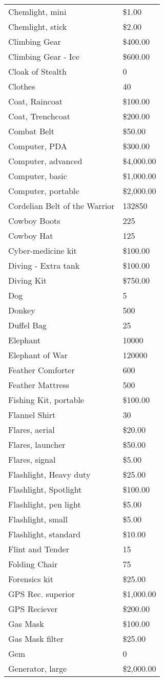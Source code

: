 \documentclass[twoside]{book}
\begin{document}
\begin{longtable}{p{1.25in}l}
      \raggedright  Chemlight, mini& \$1.00\tabularnewline
      \raggedright  Chemlight, stick& \$2.00\tabularnewline
      \raggedright  Climbing Gear& \$400.00\tabularnewline
      \raggedright  Climbing Gear - Ice& \$600.00\tabularnewline
      \raggedright  Cloak of Stealth& 0\tabularnewline
      \raggedright  Clothes& 40\tabularnewline
      \raggedright  Coat, Raincoat& \$100.00\tabularnewline
      \raggedright  Coat, Trenchcoat& \$200.00\tabularnewline
      \raggedright  Combat Belt& \$50.00\tabularnewline
      \raggedright  Computer, PDA& \$300.00\tabularnewline
      \raggedright  Computer, advanced& \$4,000.00\tabularnewline
      \raggedright  Computer, basic& \$1,000.00\tabularnewline
      \raggedright  Computer, portable& \$2,000.00\tabularnewline
      \raggedright  Cordelian Belt of the Warrior& 132850\tabularnewline
      \raggedright  Cowboy Boots& 225\tabularnewline
      \raggedright  Cowboy Hat& 125\tabularnewline
      \raggedright  Cyber-medicine kit& \$100.00\tabularnewline
      \raggedright  Diving - Extra tank& \$100.00\tabularnewline
      \raggedright  Diving Kit& \$750.00\tabularnewline
      \raggedright  Dog& 5\tabularnewline
      \raggedright  Donkey& 500\tabularnewline
      \raggedright  Duffel Bag& 25\tabularnewline
      \raggedright  Elephant& 10000\tabularnewline
      \raggedright  Elephant of War& 120000\tabularnewline
      \raggedright  Feather Comforter& 600\tabularnewline
      \raggedright  Feather Mattress& 500\tabularnewline
      \raggedright  Fishing Kit, portable& \$100.00\tabularnewline
      \raggedright  Flannel Shirt& 30\tabularnewline
      \raggedright  Flares, aerial& \$20.00\tabularnewline
      \raggedright  Flares, launcher& \$50.00\tabularnewline
      \raggedright  Flares, signal& \$5.00\tabularnewline
      \raggedright  Flashlight, Heavy duty& \$25.00\tabularnewline
      \raggedright  Flashlight, Spotlight& \$100.00\tabularnewline
      \raggedright  Flashlight, pen light& \$5.00\tabularnewline
      \raggedright  Flashlight, small& \$5.00\tabularnewline
      \raggedright  Flashlight, standard& \$10.00\tabularnewline
      \raggedright  Flint and Tender& 15\tabularnewline
      \raggedright  Folding Chair& 75\tabularnewline
      \raggedright  Forensics kit& \$25.00\tabularnewline
      \raggedright  GPS Rec. superior& \$1,000.00\tabularnewline
      \raggedright  GPS Reciever& \$200.00\tabularnewline
      \raggedright  Gas Mask& \$100.00\tabularnewline
      \raggedright  Gas Mask filter& \$25.00\tabularnewline
      \raggedright  Gem& 0\tabularnewline
      \raggedright  Generator, large& \$2,000.00\tabularnewline

\end{longtable}
\end{document}

